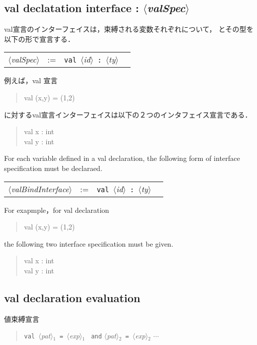 \documentclass{jbook}
\newcommand{\txt}[2]{#2}
\newcommand{\nonterm}[1]{\mbox{$\langle$}{\it #1}\mbox{$\rangle$}}
\newcommand{\term}[1]{\mbox{{\tt #1}}}
\newenvironment{program}{\begin{quote}\begin{tt}}%
                        {\end{tt}\end{quote}}
\begin{document}
\subsection{\txt{val宣言インタフェイス}{val declatation interface} : \nonterm{valSpec}}
\ifjp%
	val宣言のインターフェイスは，束縛される変数それぞれについて，
とその型を以下の形で宣言する．
\begin{center}
\begin{tabular}{lcll}
\nonterm{valSpec} &:=& \term{val}\ \nonterm{id}\ \term{:}\ \nonterm{ty}
\end{tabular}
\end{center}
	例えば，val 宣言
\begin{program}
val (x,y) = (1,2)
\end{program}
に対するval宣言インターフェイスは以下の２つのインタフェイス宣言である．
\begin{program}
val x : int\\
val y : int
\end{program}
\else%
	For each variable defined in a val declaration, the following
form of interface specification must be declaraed.
\begin{center}
\begin{tabular}{lcll}
\nonterm{valBindInterface} &:=& \term{val}\ \nonterm{id}\ \term{:}\ \nonterm{ty}
\end{tabular}
\end{center}
	For exapmple，for val declaration
\begin{program}
val (x,y) = (1,2)
\end{program}
the following two interface specification must be given.
\begin{program}
val x : int\\
val y : int
\end{program}
\fi%

\subsection{\txt{val宣言の評価}{val declaration evaluation}}
\ifjp%

	値束縛宣言

\begin{program}
\term{val}\ \nonterm{pat}$_1$\ \term{=}\ \nonterm{exp}$_1$ \ \term{and} \nonterm{pat}$_2$\ \term{=}\ \nonterm{exp}$_2$ $\cdots$
\end{program}
\end{document}
